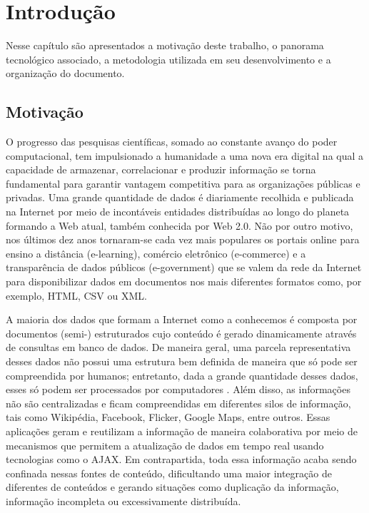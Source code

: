 \chapter{Introdução}
\label{cap:introducao}

Nesse capítulo são apresentados a motivação deste trabalho, o panorama tecnológico associado, a metodologia utilizada em seu desenvolvimento e a organização do documento.

\section{Motivação}
\label{sec:motivacao}

O progresso das pesquisas científicas, somado ao constante avanço do poder computacional, tem impulsionado a humanidade a uma nova era digital na qual a capacidade de armazenar, correlacionar e produzir informação se torna fundamental para garantir vantagem competitiva para as organizações públicas e privadas. Uma grande quantidade de dados é diariamente recolhida e publicada na Internet por meio de incontáveis entidades distribuídas ao longo do planeta formando a Web atual, também conhecida por Web 2.0. Não por outro motivo, nos últimos dez anos tornaram-se cada vez mais populares os portais online para ensino a distância (e-learning), comércio eletrônico (e-commerce) e a transparência de dados públicos (e-government) \citep{Mustapasa2010, Klischewski2006} que se valem da rede da Internet para disponibilizar dados em documentos nos mais diferentes formatos como, por exemplo, HTML, CSV ou XML.

A maioria dos dados que formam a Internet como a conhecemos é composta por documentos (semi-) estruturados cujo conteúdo é gerado dinamicamente através de consultas em banco de dados. De maneira geral, uma parcela representativa desses dados não possui uma estrutura bem definida de maneira que só pode ser compreendida por humanos; entretanto, dada a grande quantidade desses dados, esses só podem ser processados por computadores \citep{Stumme2006}. Além disso, as informações não são centralizadas e ficam compreendidas em diferentes silos de informação, tais como  Wikipédia,  Facebook,  Flicker,  Google Maps, entre outros. Essas aplicações geram e reutilizam a informação de maneira colaborativa por meio de mecanismos que permitem a atualização de dados em tempo real usando tecnologias como o AJAX. Em contrapartida, toda essa informação acaba sendo confinada nessas fontes de conteúdo, dificultando uma maior integração de diferentes de conteúdos e gerando situações como duplicação da informação, informação incompleta ou excessivamente distribuída. 

